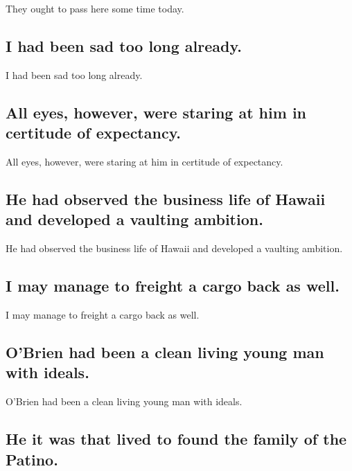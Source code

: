 \documentclass[]{article}
\begin{document}
They ought to pass here some time today.

\hypertarget{i-had-been-sad-too-long-already.}{%
\subsection{I had been sad too long
already.}\label{i-had-been-sad-too-long-already.}}

I had been sad too long already.

\hypertarget{all-eyes-however-were-staring-at-him-in-certitude-of-expectancy.}{%
\subsection{All eyes, however, were staring at him in certitude of
expectancy.}\label{all-eyes-however-were-staring-at-him-in-certitude-of-expectancy.}}

All eyes, however, were staring at him in certitude of expectancy.

\hypertarget{he-had-observed-the-business-life-of-hawaii-and-developed-a-vaulting-ambition.}{%
\subsection{He had observed the business life of Hawaii and developed a
vaulting
ambition.}\label{he-had-observed-the-business-life-of-hawaii-and-developed-a-vaulting-ambition.}}

He had observed the business life of Hawaii and developed a vaulting
ambition.

\hypertarget{i-may-manage-to-freight-a-cargo-back-as-well.}{%
\subsection{I may manage to freight a cargo back as
well.}\label{i-may-manage-to-freight-a-cargo-back-as-well.}}

I may manage to freight a cargo back as well.

\hypertarget{obrien-had-been-a-clean-living-young-man-with-ideals.}{%
\subsection{O'Brien had been a clean living young man with
ideals.}\label{obrien-had-been-a-clean-living-young-man-with-ideals.}}

O'Brien had been a clean living young man with ideals.

\hypertarget{he-it-was-that-lived-to-found-the-family-of-the-patino.}{%
\subsection{He it was that lived to found the family of the
Patino.}\label{he-it-was-that-lived-to-found-the-family-of-the-patino.}}
\end{document}
